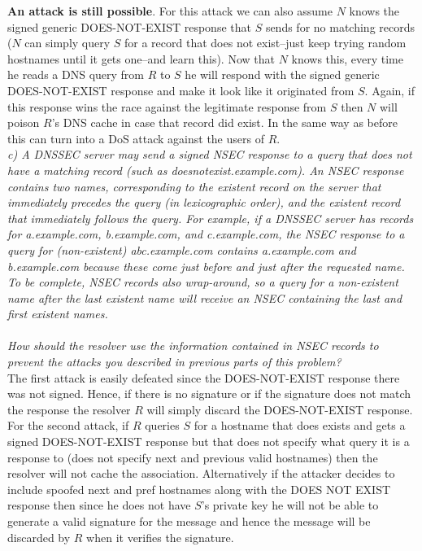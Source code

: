 \textbf{An attack is still possible}. For this attack we can also assume $N$ knows the signed generic DOES-NOT-EXIST response that $S$ sends for no matching records ($N$ can simply query $S$ for a record that does not exist--just keep trying random hostnames until it gets one--and learn this). Now that $N$ knows this, every time he reads a DNS query from $R$ to $S$ he will respond with the signed generic DOES-NOT-EXIST response and make it look like it originated from $S$. Again, if this response wins the race against the legitimate response from $S$ then $N$ will poison $R$'s DNS cache in case that record did exist. In the same way as before this can turn into a DoS attack against the users of $R$.\\

\noindent \textit{c) A DNSSEC server may send a signed NSEC response to a query that does not have a matching record (such as doesnotexist.example.com). An NSEC response contains two names, corresponding to the existent record on the server that immediately precedes the query (in lexicographic order), and the existent record that immediately follows the query. For example, if a DNSSEC server has records for a.example.com, b.example.com, and c.example.com, the NSEC response to a query for (non-existent) abc.example.com contains a.example.com and b.example.com because these come just before and just after the requested name. To be complete, NSEC records also wrap-around, so a query for a non-existent name after the last existent name will receive an NSEC containing the last and first existent names.\\\\
How should the resolver use the information contained in NSEC records to prevent the attacks you described in previous parts of this problem?}\\

The first attack is easily defeated since the DOES-NOT-EXIST response there was not signed. Hence, if there is no signature or if the signature does not match the response the resolver $R$ will simply discard the DOES-NOT-EXIST response. For the second attack, if $R$ queries $S$ for a hostname that does exists and gets a signed DOES-NOT-EXIST response but that does not specify what query it is a response to (does not specify next and previous valid hostnames) then the resolver will not cache the association. Alternatively if the attacker decides to include spoofed next and pref hostnames along with the DOES NOT EXIST response then since he does not have $S$'s private key he will not be able to generate a valid signature for the message and hence the message will be discarded by $R$ when it verifies the signature. \\


